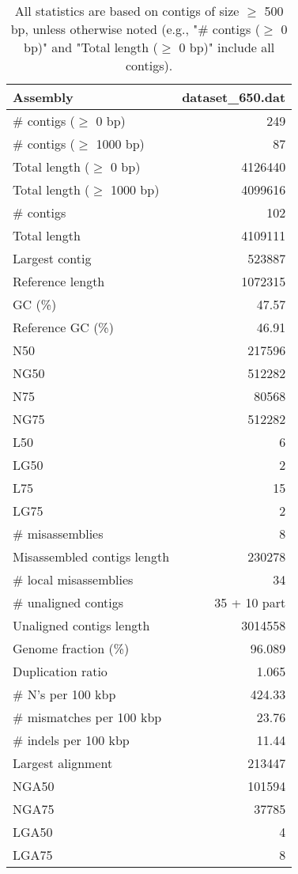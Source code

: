 \documentclass[12pt,a4paper]{article}
\begin{document}
\begin{table}[ht]
\begin{center}
\caption{All statistics are based on contigs of size $\geq$ 500 bp, unless otherwise noted (e.g., "\# contigs ($\geq$ 0 bp)" and "Total length ($\geq$ 0 bp)" include all contigs).}
\begin{tabular}{|l*{1}{|r}|}
\hline
Assembly & dataset\_650.dat \\ \hline
\# contigs ($\geq$ 0 bp) & 249 \\ \hline
\# contigs ($\geq$ 1000 bp) & 87 \\ \hline
Total length ($\geq$ 0 bp) & 4126440 \\ \hline
Total length ($\geq$ 1000 bp) & 4099616 \\ \hline
\# contigs & 102 \\ \hline
Total length & 4109111 \\ \hline
Largest contig & 523887 \\ \hline
Reference length & 1072315 \\ \hline
GC (\%) & 47.57 \\ \hline
Reference GC (\%) & 46.91 \\ \hline
N50 & 217596 \\ \hline
NG50 & 512282 \\ \hline
N75 & 80568 \\ \hline
NG75 & 512282 \\ \hline
L50 & 6 \\ \hline
LG50 & 2 \\ \hline
L75 & 15 \\ \hline
LG75 & 2 \\ \hline
\# misassemblies & 8 \\ \hline
Misassembled contigs length & 230278 \\ \hline
\# local misassemblies & 34 \\ \hline
\# unaligned contigs & 35 + 10 part \\ \hline
Unaligned contigs length & 3014558 \\ \hline
Genome fraction (\%) & 96.089 \\ \hline
Duplication ratio & 1.065 \\ \hline
\# N's per 100 kbp & 424.33 \\ \hline
\# mismatches per 100 kbp & 23.76 \\ \hline
\# indels per 100 kbp & 11.44 \\ \hline
Largest alignment & 213447 \\ \hline
NGA50 & 101594 \\ \hline
NGA75 & 37785 \\ \hline
LGA50 & 4 \\ \hline
LGA75 & 8 \\ \hline
\end{tabular}
\end{center}
\end{table}
\end{document}

